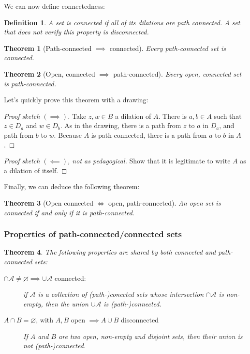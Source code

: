 \documentclass{article}
\newtheorem*{defi}{Definition}
\newtheorem*{thm*}{Theorem}
\let\emptyset\varnothing
\begin{document}
We can now define connectedness:

\begin{defi}
    A set is connected if all of its dilations are path connected. A set that does not verify this property is disconnected.
\end{defi}

\begin{thm*}[Path-connected $\implies$ connected]
    Every path-connected set is connected.
\end{thm*}

\begin{thm*}[Open, connected $\implies$ path-connected]
    Every open, connected set is path-connected.
\end{thm*}

Let's quickly prove this theorem with a drawing:

\begin{proof}[Proof sketch $(\implies)$]
    Take $z, w \in B$ a dilation of $A$. There is $a, b \in A$ such that $z\in D_a$ and $w\in D_b$.
    As in the drawing, there is a path from $z$ to $a$ in $D_a$, and path from $b$ to $w$. Because $A$ is path-connected, there is a path from $a$ to $b$ in $A$. 
\end{proof}
\begin{proof}[Proof sketch $(\impliedby)$, not as pedagogical]
    Show that it is legitimate to write $A$ as a dilation of itself.
\end{proof}

Finally, we can deduce the following theorem:

\begin{thm*}[Open connected $\iff$ open, path-connected]
   An open set is connected if and only if it is path-connected. 
\end{thm*}

\subsubsection{Properties of path-connected/connected sets}

\begin{thm*}
    The following properties are shared by both connected and path-connected sets:
    \begin{description}
        \item[$\cap \mathcal{A} \neq \emptyset \implies \cup \mathcal{A}$ connected: ] if $\mathcal{A}$ is a collection of (path-)conected sets whose intersection $\cap \mathcal{A}$ is non-empty, then the union $\cup \mathcal{A}$ is (path-)connected.
        \item[$A \cap B = \emptyset$, with $A,B$ open $ \implies A\cup B$ disconnected] If $A$ and $B$ are two open, non-empty and disjoint sets, then their union is not (path-)connected.
    \end{description}
\end{thm*}
\end{document}

